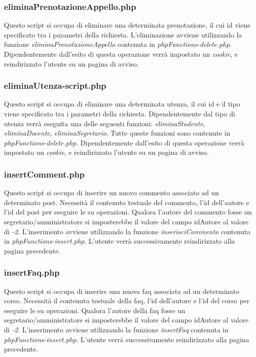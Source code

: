 \documentclass [a4paper,11pt]{book}
\begin{document}
\medskip

\subsubsection{eliminaPrenotazioneAppello.php}

Questo script si occupa di eliminare una determinata prenotazione, il cui id viene specificato tra i parametri della richiesta. L'eliminazione avviene utilizzando la funzione \emph{eliminaPrenotazioneAppello} contenuta in \emph{phpFunctions-delete.php}.
Dipendentemente dall'esito di questa operazione verrà impostato un \emph{cookie}, e reindirizzato l'utente su un pagina di avviso.
\medskip

\subsubsection{eliminaUtenza-script.php}

Questo script si occupa di eliminare una determinata utenza, il cui id e il tipo viene specificato tra i parametri della richiesta. Dipendentemente dal tipo di utenza verrà eseguita una delle seguenti funzioni: \emph{eliminaStudente}, \emph{eliminaDocente}, \emph{eliminaSegretario}. Tutte queste funzioni sono contenute in \emph{phpFunctions-delete.php}.
Dipendentemente dall'esito di questa operazione verrà impostato un \emph{cookie}, e reindirizzato l'utente su un pagina di avviso.
\medskip

\subsubsection{insertComment.php}

Questo script si occupa di inserire un nuovo commento associato ad un determinato post. Necessità il contenuto testuale del commento, l'id dell'autore e l'id del post per eseguire le su operazioni. Qualora l'autore del commento fosse un segretario/amministratore si imposterebbe il valore del campo idAutore al valore di \emph{-2}. L'inserimento avviene utilizzando la funzione \emph{inserisciCommento} contenuta in \emph{phpFunctions-insert.php}.
L'utente verrà successivamente reindirizzato alla pagina precedente.

\medskip

\subsubsection{insertFaq.php}

Questo script si occupa di inserire una nuova faq associata ad un determinato corso. Necessità il contenuto testuale della faq, l'id dell'autore e l'id del corso per eseguire le su operazioni. Qualora l'autore della faq fosse un segretario/amministratore si imposterebbe il valore del campo idAutore al valore di \emph{-2}. L'inserimento avviene utilizzando la funzione \emph{insertFaq} contenuta in \emph{phpFunctions-insert.php}.
L'utente verrà successivamente reindirizzato alla pagina precedente.
\end{document}
